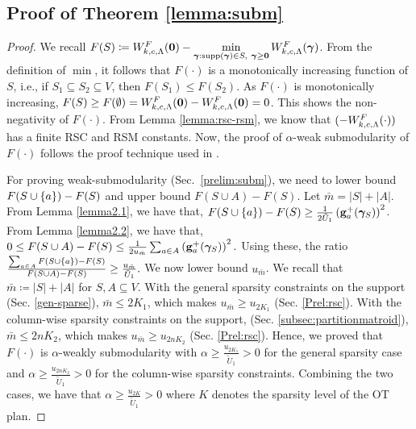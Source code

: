 \subsection[Proof of Weak-Submodularity of our Set Function]{Proof of Theorem \ref{lemma:subm}}\label{app-lemma:subm}
\lemmasubm*
\begin{proof}
We recall $F(S) \coloneqq W^F_{k, c, \Lambda}(\mathbf{0})-\min\limits_{\bm{\gamma}:\textup{supp}(\bm{\gamma})\in S,~ \bm{\gamma}\ge \mathbf{0}} W^F_{k, c, \Lambda}({\bm{\gamma}})$. From the definition of $\min$, it follows that $F(\cdot)$ is a monotonically increasing function of $S$, i.e., if $S_1\subseteq S_2\subseteq V$, then $F(S_1)\leq F(S_2)$. As $F(\cdot)$ is monotonically increasing, $F(S)\geq F(\emptyset)=W^F_{k, c, \Lambda}(\mathbf{0})-W^F_{k, c, \Lambda}(\mathbf{0})=0$. This shows the non-negativity of $F(\cdot)$. From Lemma \ref{lemma:rsc-rsm}, we know that $(-W^F_{k, c, \Lambda}(\cdot))$ has a finite RSC and RSM constants. Now, the proof of $\alpha$-weak submodularity of $F(\cdot)$ follows the proof technique used in \citet[Theorem $IV.3$]{gurumoorthy19a}.

For proving weak-submodularity (Sec.~\ref{prelim:subm}), we need to lower bound $F(S\cup \{a\})-F(S)$ and upper bound $F(S\cup A)-F(S)$. Let $\bar{m}=|S|+|A|$. From Lemma \ref{lemma2.1}, we have that, $F(S\cup \{a\})-F(S)\geq \frac{1}{2\tilde{U}_1}\left( \mathbf{g}^+_a(\bm{\gamma}_S)\right)^2$. From Lemma \ref{lemma2.2}, we have that, $0\leq F(S\cup A)-F(S)\leq \frac{1}{2u_{\bar{m}}}\sum_{a\in A}\left(\mathbf{g}^+_a(\bm{\gamma}_S) \right)^2.$ Using these, the ratio $\frac{\sum_{a\in A}F(S\cup \{a\})-F(S)}{F(S\cup A)-F(S)}\geq \frac{u_{\bar{m}}}{\tilde{U}_1}.$ We now lower bound $u_{\bar{m}}$. We recall that $\bar{m}\coloneqq|S|+|A|$ for $S, A\subseteq V$. With the general sparsity constraints on the support (Sec. \ref{gen-sparse}), $\bar{m}\leq 2K_1$, which makes $u_{\bar{m}}\geq u_{2K_1}$ (Sec. \ref{Prel:rsc}). With the column-wise sparsity constraints on the support, (Sec. \ref{subsec:partitionmatroid}), $\bar{m}\leq 2nK_2$, which makes $u_{\bar{m}}\geq u_{2nK_2}$ (Sec. \ref{Prel:rsc}). Hence, we proved that $F(\cdot)$ is $\alpha$-weakly submodularity with $\alpha\geq \frac{u_{2K_1}}{\tilde{U}_1}>0$ for the general sparsity case and $\alpha\geq \frac{u_{2nK_2}}{\tilde{U}_1}>0$ for the column-wise sparsity constraints. Combining the two cases, we have that $\alpha\geq \frac{u_{2K}}{\tilde{U}_1}>0$ where $K$ denotes the sparsity level of the OT plan.
\end{proof}

